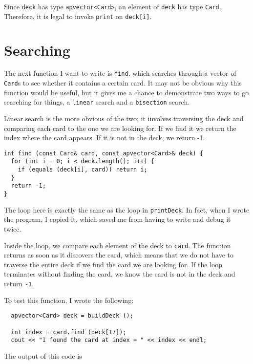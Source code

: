 Since {\tt deck} has type {\tt apvector<Card>}, an element of {\tt deck}
has type {\tt Card}.  Therefore, it is legal to invoke {\tt print}
on {\tt deck[i]}.

\section{Searching}
\label{find}

The next function I want to write is {\tt find}, which searches
through a vector of {\tt Card}s to see whether it contains a certain
card.  It may not be obvious why this function would be useful, but it
gives me a chance to demonstrate two ways to go searching for things,
a {\tt linear} search and a {\tt bisection} search.


Linear search is the more obvious of the two; it involves traversing
the deck and comparing each card to the one we are looking for.  If we
find it we return the index where the card appears.  If it is not in
the deck, we return -1.

\begin{verbatim}
int find (const Card& card, const apvector<Card>& deck) {
  for (int i = 0; i < deck.length(); i++) {
    if (equals (deck[i], card)) return i;
  }
  return -1;
}
\end{verbatim}
%
The loop here is exactly the same as the loop in {\tt printDeck}.
In fact, when I wrote the program, I copied it, which saved me
from having to write and debug it twice.

Inside the loop, we compare each element of the deck to
{\tt card}.  The function returns as soon as it discovers
the card, which means that we do not have to traverse the entire
deck if we find the card we are looking for.  If the loop terminates
without finding the card, we know the card is not in the deck
and return {\tt -1}.


To test this function, I wrote the following:

\begin{verbatim}
  apvector<Card> deck = buildDeck ();

  int index = card.find (deck[17]);
  cout << "I found the card at index = " << index << endl;
\end{verbatim}
%
The output of this code is

